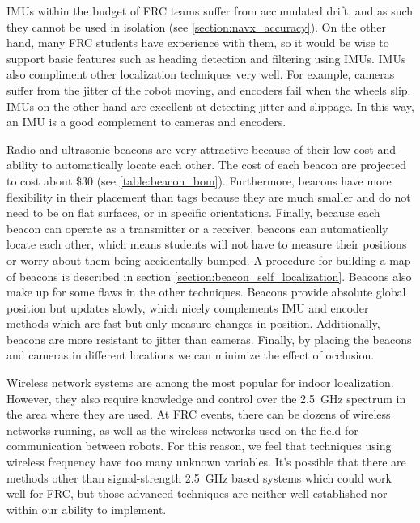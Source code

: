 \documentclass{article}
\begin{document}
  IMUs within the budget of FRC teams suffer from accumulated drift, and as such they cannot be used in isolation (see \ref{section:navx_accuracy}). On the other hand, many FRC students have experience with them, so it would be wise to support basic features such as heading detection and filtering using IMUs. IMUs also compliment other localization techniques very well. For example, cameras suffer from the jitter of the robot moving, and encoders fail when the wheels slip. IMUs on the other hand are excellent at detecting jitter and slippage. In this way, an IMU is a good complement to cameras and encoders.

  Radio and ultrasonic beacons are very attractive because of their low cost and ability to automatically locate each other. The cost of each beacon are projected to cost about \$30 (see \ref{table:beacon_bom}). Furthermore, beacons have more flexibility in their placement than tags because they are much smaller and do not need to be on flat surfaces, or in specific orientations. Finally, because each beacon can operate as a transmitter or a receiver, beacons can automatically locate each other, which means students will not have to measure their positions or worry about them being accidentally bumped. A procedure for building a map of beacons is described in section \ref{section:beacon_self_localization}. Beacons also make up for some flaws in the other techniques. Beacons provide absolute global position but updates slowly, which nicely complements IMU and encoder methods which are fast but only measure changes in position. Additionally, beacons are more resistant to jitter than cameras. Finally, by placing the beacons and cameras in different locations we can minimize the effect of occlusion.

  Wireless network systems are among the most popular for indoor localization. However, they also require knowledge and control over the \SI{2.5}{\giga\hertz} spectrum in the area where they are used. At FRC events, there can be dozens of wireless networks running, as well as the wireless networks used on the field for communication between robots. For this reason, we feel that techniques using wireless frequency have too many unknown variables. It's possible that there are methods other than signal-strength \SI{2.5}{\giga\hertz} based systems which could work well for FRC, but those advanced techniques are neither well established nor within our ability to implement.
\end{document}
